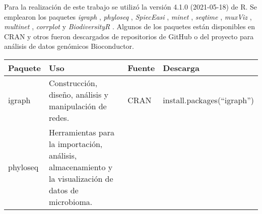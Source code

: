 \documentclass[
]{book}
\begin{document}
Para la realización de este trabajo se utilizó la versión 4.1.0 (2021-05-18) de R. Se emplearon los paquetes \emph{igraph} \citep{igraph}, \emph{phyloseq} \citep{phyloseq}, \emph{SpiecEasi} \citep{SpiecEasi}, \emph{minet} \citep{minet}, \emph{seqtime} \citep{seqtime}, \emph{muxViz} \citep{muxViz}, \emph{multinet} \citep{multinet}, \emph{corrplot} \citep{corrplot2021} y \emph{BiodiversityR} \citep{BiodiversityR}. Algunos de los paquetes están disponibles en CRAN y otros fueron descargados de repositorios de GitHub o del proyecto para análisis de datos genómicos Bioconductor.

\begin{longtable}[]{@{}llll@{}}
\toprule
\begin{minipage}[b]{0.24\columnwidth}\raggedright
Paquete\strut
\end{minipage} & \begin{minipage}[b]{0.15\columnwidth}\raggedright
Uso\strut
\end{minipage} & \begin{minipage}[b]{0.24\columnwidth}\raggedright
Fuente\strut
\end{minipage} & \begin{minipage}[b]{0.27\columnwidth}\raggedright
Descarga\strut
\end{minipage}\tabularnewline
\midrule
\endhead
\begin{minipage}[t]{0.24\columnwidth}\raggedright
igraph\strut
\end{minipage} & \begin{minipage}[t]{0.15\columnwidth}\raggedright
Construcción, diseño, análisis y manipulación de redes.\strut
\end{minipage} & \begin{minipage}[t]{0.24\columnwidth}\raggedright
CRAN\strut
\end{minipage} & \begin{minipage}[t]{0.27\columnwidth}\raggedright
install.packages(``igraph'')\strut
\end{minipage}\tabularnewline
\begin{minipage}[t]{0.24\columnwidth}\raggedright
phyloseq\strut
\end{minipage} & \begin{minipage}[t]{0.15\columnwidth}\raggedright
Herramientas para la importación, análisis, almacenamiento y la visualización de datos de microbioma.\strut
\end{minipage} & \begin{minipage}[t]{0.24\columnwidth}\raggedright

\end{minipage}
\end{longtable}
\end{document}
